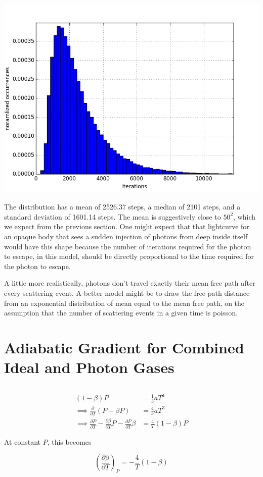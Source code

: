 \documentclass[12pt]{article}
\newcommand{\pdiff}[2]{\frac{\partial #1}{\partial #2}}
\newcommand{\cpdiff}[3]{\left(\pdiff{#1}{#2}\right)_{#3}}
\begin{document}
\begin{center}
\includegraphics[scale=.7]{png/photon_walk.png}
\end{center}

The distribution has a mean of 2526.37 steps, a median of 2101 steps, and a standard deviation of 1601.14 steps. The mean is suggestively close to \(50^2\), which we expect from the previous section. One might expect that that lightcurve for an opaque body that sees a sudden injection of photons from deep inside itself would have this shape because the number of iterations required for the photon to escape, in this model, should be directly proportional to the time required for the photon to escape. 

A little more realistically, photons don't travel exactly their mean free path after every scattering event. A better model might be to draw the free path distance from an exponential distribution of mean equal to the mean free path, on the assumption that the number of scattering events in a given time is poisson.


\section{Adiabatic Gradient for Combined Ideal and Photon Gases}

\subsection{}

\begin{align*}
(1-\beta)P &= \frac{1}{3}aT^4 \\
\implies \frac{\partial}{\partial T} (P-\beta P) &= \frac{4}{3}a T^3 \\
\implies \frac{\partial P}{\partial T} - \pdiff{\beta}{T}P - \pdiff{P}{T}\beta &= \frac{4}{T}(1-\beta)P
\end{align*}

At constant \(P\), this becomes

\[ \cpdiff{\beta}{T}{P} = -\frac{4}{T}(1-\beta)
\]

\subsection{}
\end{document}
